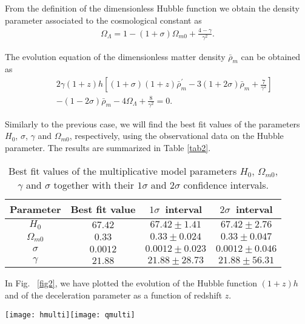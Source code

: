 \documentclass[aps,superscriptaddress, showpacs,preprintnumbers, superscriptaddress, nofootinbibt,twocolumn]{revtex4}
\def\bea{\begin{eqnarray}}
\def\eea{\end{eqnarray}}
\begin{document}
From the definition of the dimensionless Hubble function we obtain the density parameter associated to the cosmological constant  as
\begin{align}
\Omega_{\Lambda}=1-(1+\sigma)\Omega_{m0}+\frac{4-\gamma}{\gamma^2}.
\end{align}

The evolution equation of the dimensionless matter density $\bar\rho_m$ can be obtained as
\bea
&&2\gamma(1+z)h\left[(1+\sigma)(1+z)\bar\rho_m^\prime-3(1+2\sigma)\bar\rho_m+\frac{7}{\gamma^2}\right]\nonumber\\
&&-(1-2\sigma)\bar\rho_m-4\Omega_{\Lambda}+\frac{8}{\gamma^2}=0.
\eea

Similarly to the previous case, we will find the best fit values of the parameters $H_0$, $\sigma$, $\gamma$ and $\Omega_{m0}$, respectively,  using the observational data on the Hubble parameter. The results are summarized in Table \eqref{tab2}.
\begin{table}[h]
	\begin{center}
		\begin{tabular}{|c||c|c|c|}
			\hline
			Parameter&Best fit value&$1\sigma$~interval&$2\sigma$~interval\\
			\hline
			$H_0$&$67.42$&$67.42\pm1.41$&$67.42\pm2.76$\\
			\hline
			$\Omega_{m0}$&$0.33$&$0.33\pm0.024$&$0.33\pm0.047$\\
			\hline
			$\sigma$&$0.0012$&$0.0012\pm0.023$&$0.0012\pm0.046$\\
			\hline
			$\gamma$&$21.88$&$21.88\pm28.73$&$21.88\pm56.31$
			\\
			\hline
		\end{tabular}
	\end{center}
	\caption{Best fit values of the multiplicative model parameters $H_0$, $\Omega_{m0}$, $\gamma$ and $\sigma$ together with their $1\sigma$ and $2\sigma$ confidence intervals.\label{tab2}}
\end{table}

In Fig.~ \ref{fig2}, we have plotted the evolution of the Hubble function $(1+z)h$ and of the deceleration parameter  as a function of redshift $z$.
\begin{figure*}
	\centering
	\texttt{[image: hmulti]}\texttt{[image: qmulti]}
	\caption{Evolutions of the Hubble function $(1+z)h$ (left panel) and of the deceleration parameter $q$ (right panel) as a function of the redshift for different values of  $(\sigma,\gamma)$: $(\sigma,\gamma)=(0.0012,21.88)$ (best fit, dashed), $(0.04,70)$ (dotted), and $(-0.03,-10)$ (dot-dashed), respectively. We have used the best fit values for the Hubble parameter and the current matter density abundance. The solid red line corresponds to the $\Lambda$CDM theory.  The error bars indicate the observational values \cite{hubble}.}\label{fig2}
\end{figure*}
\end{document}
